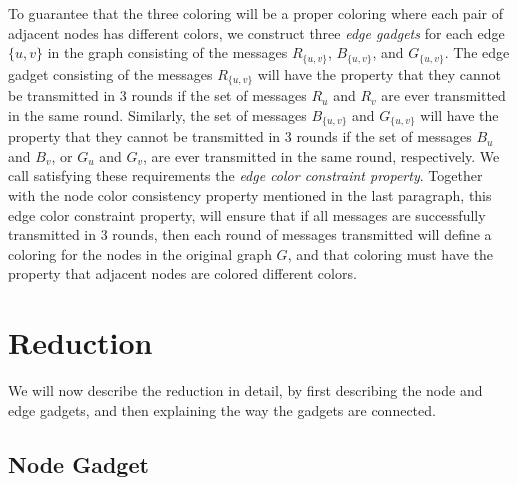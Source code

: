 \documentclass{article}
\begin{document}
To guarantee that the three coloring will be a proper coloring where each pair of adjacent nodes has different colors, we construct three \emph{edge gadgets} for each edge $\{u,v\}$ in the graph consisting of the messages $R_{\{u,v\}}$, $B_{\{u,v\}}$, and $G_{\{u,v\}}$.  The edge gadget consisting of the messages $R_{\{u,v\}}$ will have the property that they cannot be transmitted in 3 rounds if the set of messages $R_u$ and $R_v$ are ever transmitted in the same round.  Similarly, the set of messages $B_{\{u,v\}}$ and $G_{\{u,v\}}$ will have the property that they cannot be transmitted in 3 rounds if the set of messages $B_u$ and $B_v$, or $G_u$ and $G_v$, are ever transmitted in the same round, respectively.  We call satisfying these requirements the \emph{edge color constraint property}.  Together with the node color consistency property mentioned in the last paragraph, this edge color constraint property, will ensure that if all messages are successfully transmitted in 3 rounds, then each round of messages transmitted will define a coloring for the nodes in the original graph $G$, and that coloring must have the property that adjacent nodes are colored different colors.





\section{Reduction}
\label{sec:mainresult}
We will now describe the reduction in detail, by first describing the node and edge gadgets, and then explaining the way the gadgets are connected.


\subsection{Node Gadget}
\end{document}
